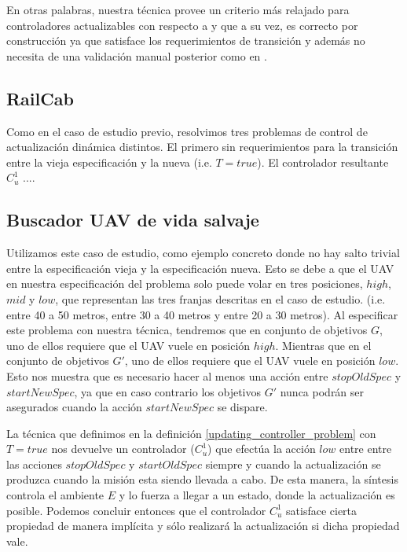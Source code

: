 En otras palabras, nuestra técnica provee un criterio más relajado para controladores actualizables con respecto a
\cite{6224401} y que a su vez, es correcto por construcción ya que satisface los requerimientos de transición y además
no necesita de una validación manual posterior como en \cite{PanzicaLaManna:2013:FCC:2487336.2487349}.

\subsection{RailCab}

Como en el caso de estudio previo, resolvimos tres problemas de control de actualización dinámica distintos. El primero
sin requerimientos para la transición entre la vieja especificación y la nueva (i.e. $T = true$). El controlador
resultante $C^1_u$ ....

\subsection{Buscador UAV de vida salvaje}

Utilizamos este caso de estudio, como ejemplo concreto donde no hay salto trivial entre la especificación vieja y la
especificación nueva. Esto se debe a que el UAV en nuestra especificación del problema solo puede volar en tres
posiciones, $high$, $mid$ y $low$, que representan las tres franjas descritas en el caso de estudio. (i.e. entre 40 a 50
metros, entre 30 a 40 metros y entre 20 a 30 metros). Al especificar este problema con nuestra técnica, tendremos que en
conjunto de objetivos $G$, uno de ellos requiere que el UAV vuele en posición $high$. Mientras que en el conjunto de
objetivos $G'$, uno de ellos requiere que el UAV vuele en posición $low$. Esto nos muestra que es necesario hacer
al menos una acción entre $stopOldSpec$ y $startNewSpec$, ya que en caso contrario los objetivos $G'$ nunca podrán ser
asegurados cuando la acción $startNewSpec$ se dispare.

La técnica que definimos en la definición \ref{updating_controller_problem} con $T = true$ nos devuelve un controlador
($C_u^{1}$) que efectúa la acción $low$ entre entre las acciones $stopOldSpec$ y $startOldSpec$ siempre y cuando la
actualización se produzca cuando la misión esta siendo llevada a cabo. De esta manera, la síntesis controla el ambiente
$E$ y lo fuerza a llegar a un estado, donde la actualización es posible. Podemos concluir entonces que el controlador
$C_u^1$ satisface cierta propiedad de manera implícita y sólo realizará la actualización si dicha propiedad vale.


